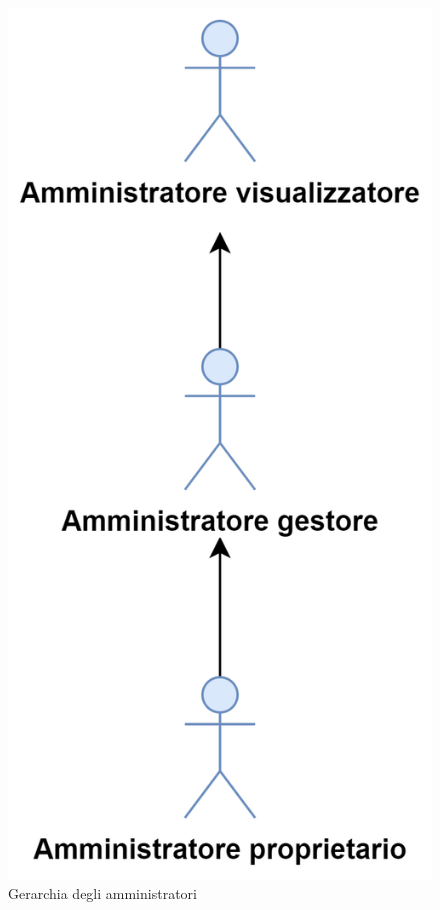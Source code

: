 \begin{figure}[h]
  \centering
    \includegraphics[scale=0.8]{Sezioni/UseCase/Immagini/Amministratori.png}
    \caption{Gerarchia degli amministratori}
\end{figure}

